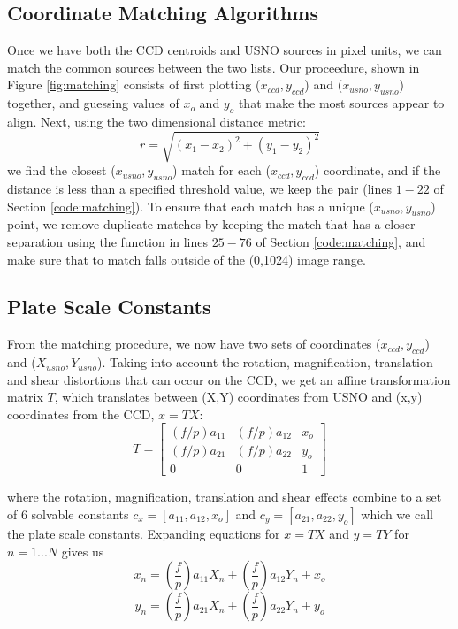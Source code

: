 \documentclass[preprint]{aastex62}
\begin{document}
\subsection{Coordinate Matching Algorithms}
Once we have both the CCD centroids and USNO sources in pixel units, we can match the common sources between the two lists. Our proceedure, shown in Figure \ref{fig:matching} consists of first plotting ($x_{ccd},y_{ccd}$) and ($x_{usno}, y_{usno}$) together, and guessing values of $x_o$ and $y_o$ that make the most sources appear to align. Next, using the two dimensional distance metric:
\begin{equation}
    r = \sqrt{(x_1-x_2)^2 + (y_1-y_2)^2}
\end{equation}
we find the closest ($x_{usno}, y_{usno}$) match for each ($x_{ccd},y_{ccd}$) coordinate, and if the distance is less than a specified threshold value, we keep the pair (lines $1-22$ of Section \ref{code:matching}). To ensure that each match has a unique ($x_{usno}, y_{usno}$) point, we remove duplicate matches by keeping the match that has a closer separation using the function in lines $25-76$ of Section \ref{code:matching}, and make sure that to match falls outside of the (0,1024) image range.

\subsection{Plate Scale Constants}
From the matching procedure, we now have two sets of coordinates ($x_{ccd},y_{ccd}$) and ($X_{usno}, Y_{usno}$). Taking into account the rotation, magnification, translation and shear distortions that can occur on the CCD, we get an affine transformation matrix $T$, which translates between (X,Y) coordinates from USNO and (x,y) coordinates from the CCD, $x=TX$:
\begin{equation}
T = 
\begin{bmatrix}
    (f/p)a_{11} & (f/p)a_{12} & x_o \\
    (f/p)a_{21} & (f/p)a_{22} & y_o \\
    0 & 0 & 1
\end{bmatrix} \label{eqn:Tmatrix}
\end{equation}

where the rotation, magnification, translation and shear effects combine to a set of 6 solvable constants $c_x = [a_{11}, a_{12}, x_o]$ and $c_y = [a_{21}, a_{22}, y_o]$ which we call the plate scale constants. Expanding equations for $x=TX$ and $y=TY$ for $n=1...N$ gives us
\begin{equation}
    x_n = \left(\frac{f}{p}\right)a_{11}X_n + \left(\frac{f}{p}\right)a_{12}Y_n  + x_o 
\end{equation} \label{eqn:xn}
\begin{equation}
    y_n = \left(\frac{f}{p}\right)a_{21}X_n + \left(\frac{f}{p}\right)a_{22}Y_n  + y_o 
\end{equation} \label{eqn:yn}
\end{document}
